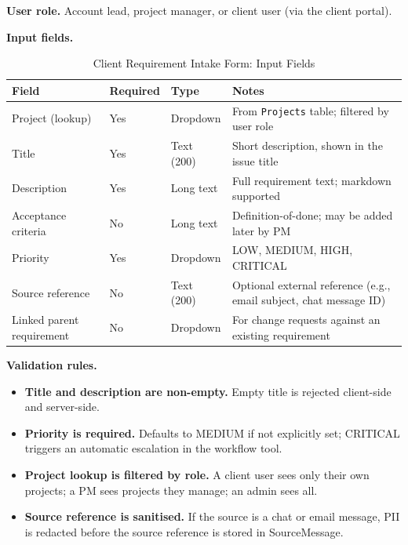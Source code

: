 \documentclass[12pt,a4paper]{report}
\begin{document}
\textbf{User role.} Account lead, project manager, or client user (via the
client portal).

\textbf{Input fields.}

\begin{table}[H]
\centering
\caption{Client Requirement Intake Form: Input Fields}
\small
\renewcommand{\arraystretch}{1.30}
\setlength{\tabcolsep}{6pt}
\begin{tabularx}{\textwidth}{>{\raggedright\arraybackslash}p{3.6cm}
                                >{\raggedright\arraybackslash}p{1.6cm}
                                >{\raggedright\arraybackslash}p{2.4cm}
                                >{\raggedright\arraybackslash}X}
\toprule
\textbf{Field} & \textbf{Required} & \textbf{Type} & \textbf{Notes} \\
\midrule
Project (lookup)            & Yes & Dropdown    & From \texttt{Projects} table; filtered by user role \\
Title                       & Yes & Text (200)  & Short description, shown in the issue title \\
Description                 & Yes & Long text   & Full requirement text; markdown supported \\
Acceptance criteria         & No  & Long text   & Definition-of-done; may be added later by PM \\
Priority                    & Yes & Dropdown    & LOW, MEDIUM, HIGH, CRITICAL \\
Source reference            & No  & Text (200)  & Optional external reference (e.g., email subject, chat message ID) \\
Linked parent requirement   & No  & Dropdown    & For change requests against an existing requirement \\
\bottomrule
\end{tabularx}
\end{table}

\textbf{Validation rules.}
\begin{itemize}[leftmargin=1.6em]
    \item \textbf{Title and description are non-empty.} Empty title is rejected
          client-side and server-side.
    \item \textbf{Priority is required.} Defaults to MEDIUM if not explicitly
          set; CRITICAL triggers an automatic escalation in the workflow
          tool.
    \item \textbf{Project lookup is filtered by role.} A client user sees only
          their own projects; a PM sees projects they manage; an admin sees
          all.
    \item \textbf{Source reference is sanitised.} If the source is a chat or
          email message, PII is redacted before the source reference is
          stored in SourceMessage.
\end{itemize}
\end{document}
